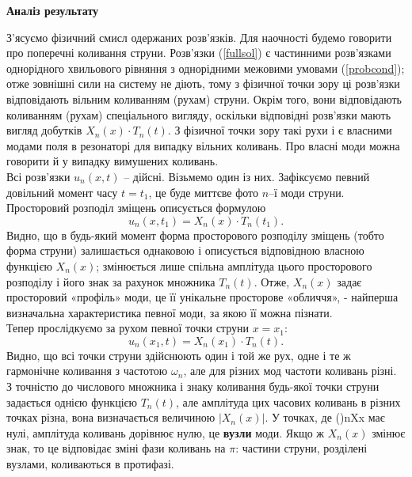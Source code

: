 \documentclass[a4paper, 14pt]{extreport}
\begin{document}
\begin{center}
    \large{\textbf{Аналіз результату}}
\end{center}
З’ясуємо фізичний смисл одержаних розв’язків. Для наочності будемо говорити про поперечні коливання струни. Розв’язки (\ref{fullsol}) є частинними розв’язками однорідного хвильового рівняння з однорідними межовими умовами (\ref{probcond}); отже зовнішні сили на систему не діють, тому з фізичної точки зору ці розв’язки відповідають вільним коливанням (рухам) струни. Окрім того, вони відповідають коливанням (рухам) спеціального вигляду, оскільки відповідні розв’язки мають вигляд добутків $X_n(x) \cdot T_n(t)$. З фізичної точки зору такі рухи і є власними модами поля в резонаторі для випадку вільних коливань. Про власні моди можна говорити й у випадку вимушених коливань.\\
Всі розв’язки $u_n(x, t)$ -- дійсні. Візьмемо один із них. Зафіксуємо певний довільний момент часу $t = t_1$, це буде миттєве фото $n$–ї моди струни. Просторовий розподіл зміщень описується формулою \[u_n(x, t_1) = X_n(x) \cdot T_n(t_1).\] Видно, що в будь-який момент форма просторового розподілу зміщень (тобто форма струни) залишається однаковою і описується відповідною власною функцією $X_n(x)$; змінюється лише спільна амплітуда цього просторового розподілу і його знак за рахунок множника $T_n(t)$. Отже, $X_n(x)$ задає просторовий «профіль» моди, це її унікальне просторове «обличчя», - найперша визначальна характеристика певної моди, за якою її можна пізнати.\\
Тепер прослідкуємо за рухом певної точки струни $x = x_1$: \[u_n(x_1, t) = X_n(x_1) \cdot T_n(t).\] Видно, що всі точки струни здійснюють один і той же рух, одне і те ж гармонічне коливання з частотою $\omega_n$, але для різних мод частоти коливань різні. З точністю до числового множника і знаку коливання будь-якої точки струни задається однією функцією $T_n(t)$, але амплітуда цих часових коливань в різних точках різна, вона визначається величиною $\left|X_n(x)\right|$. У точках, де ()nXx має нулі, амплітуда коливань дорівнює нулю, це \textbf{вузли} моди. Якщо ж $X_n(x)$ змінює знак, то це відповідає зміні фази коливань на $\pi$: частини струни, розділені вузлами, коливаються в протифазі.
\end{document}
